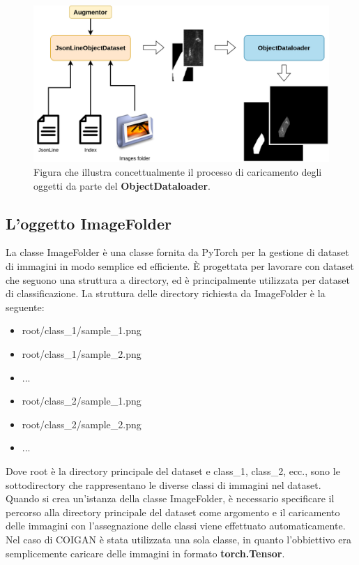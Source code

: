 \begin{figure}[H]
    \centering
    \includegraphics[width=1.0\textwidth]{imgs/Coigan/Dataloader_pipeline_example.drawio.png}
    \caption{Figura che illustra concettualmente il processo di caricamento degli oggetti da parte del \textbf{ObjectDataloader}.}
    \label{fig:object_dataloader_sample}
\end{figure}


\subsection{L'oggetto ImageFolder}
La classe ImageFolder è una classe fornita da PyTorch per la gestione di dataset di immagini in modo semplice ed efficiente. 
È progettata per lavorare con dataset che seguono una struttura a directory, ed è principalmente utilizzata per dataset di classificazione.
La struttura delle directory richiesta da ImageFolder è la seguente:

\begin{itemize}
    \item root/class\_1/sample\_1.png
    \item root/class\_1/sample\_2.png
    \item ...
    \item root/class\_2/sample\_1.png
    \item root/class\_2/sample\_2.png
    \item ...
\end{itemize}

Dove root è la directory principale del dataset e class\_1, class\_2, ecc., sono le sottodirectory che rappresentano le diverse classi di immagini nel dataset.
Quando si crea un'istanza della classe ImageFolder, è necessario specificare il percorso alla directory principale del dataset come argomento
e il caricamento delle immagini con l'assegnazione delle classi viene effettuato automaticamente.
Nel caso di COIGAN è stata utilizzata una sola classe, in quanto l'obbiettivo era semplicemente caricare delle immagini in formato \textbf{torch.Tensor}.




